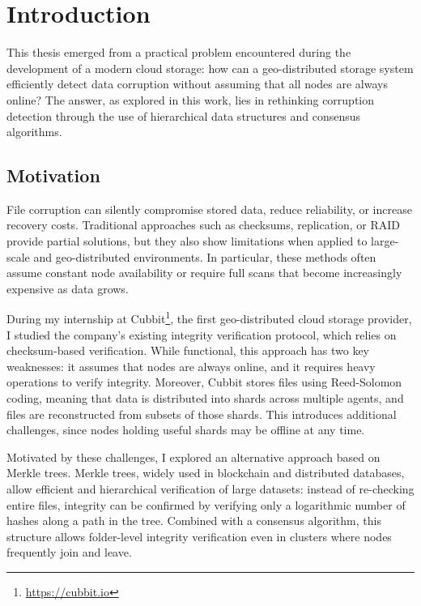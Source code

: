 \chapter{Introduction}

This thesis emerged from a practical problem encountered during the development
of a modern cloud storage: how can a geo-distributed storage system efficiently
detect data corruption without assuming that all nodes are always online? The answer, as explored in this work, lies in rethinking corruption detection through the use of hierarchical data structures and consensus algorithms.

\section{Motivation}

File corruption can silently compromise stored data, reduce reliability, or increase recovery costs. Traditional approaches such as checksums, replication, or RAID \cite{chen1994raid} provide partial solutions, but they also show limitations when applied to large-scale and geo-distributed environments. In particular, these methods often assume constant node availability or require full scans that become increasingly expensive as data grows.

During my internship at Cubbit\footnote{\url{https://cubbit.io}}, the first geo-distributed cloud storage provider, I studied the company's existing integrity verification protocol, which relies on checksum-based verification. While functional, this approach has two key weaknesses: it assumes that nodes are always online, and it requires heavy operations to verify integrity. Moreover, Cubbit stores files using Reed-Solomon coding, meaning that data is distributed into shards across multiple agents, and files are reconstructed from subsets of those shards. This introduces additional challenges, since nodes holding useful shards may be offline at any time.

Motivated by these challenges, I explored an alternative approach based on Merkle trees. Merkle trees, widely used in blockchain and distributed databases, allow efficient and hierarchical verification of large datasets: instead of re-checking entire files, integrity can be confirmed by verifying only a logarithmic number of hashes along a path in the tree. Combined with a consensus algorithm, this structure allows folder-level integrity verification even in clusters where nodes frequently join and leave.

